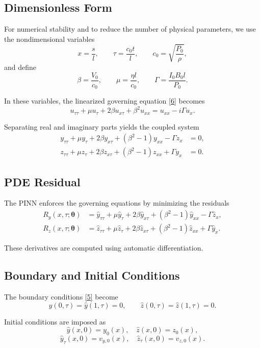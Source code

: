 \documentclass{article}
\begin{document}
\subsection{Dimensionless Form}

For numerical stability and to reduce the number of physical parameters, we use the nondimensional variables
\[
x = \frac{s}{l}, \qquad \tau = \frac{c_0 t}{l}, \qquad c_0 = \sqrt{\frac{P_0}{\rho}},
\]
and define
\[
\beta = \frac{V_0}{c_0}, \qquad
\mu = \frac{\eta l}{c_0}, \qquad
\Gamma = \frac{I_0 B_0 l}{P_0}.
\]

In these variables, the linearized governing equation \eqref{6} becomes
\[
u_{\tau\tau} + \mu u_{\tau} + 2\beta u_{x\tau} + \beta^2 u_{xx}
=
u_{xx} - i \Gamma u_x.
\tag{9}
\]

Separating real and imaginary parts yields the coupled system
\begin{align}
y_{\tau\tau} + \mu y_\tau + 2\beta y_{x\tau} + (\beta^2 - 1) y_{xx} - \Gamma z_x &= 0, \\
z_{\tau\tau} + \mu z_\tau + 2\beta z_{x\tau} + (\beta^2 - 1) z_{xx} + \Gamma y_x &= 0.
\end{align}

\subsection{PDE Residual}

The PINN enforces the governing equations by minimizing the residuals
\begin{align}
R_y(x,\tau;\bm{\theta}) &=
\hat{y}_{\tau\tau} + \mu \hat{y}_\tau + 2\beta \hat{y}_{x\tau}
+ (\beta^2 - 1)\hat{y}_{xx} - \Gamma \hat{z}_x, \\
R_z(x,\tau;\bm{\theta}) &=
\hat{z}_{\tau\tau} + \mu \hat{z}_\tau + 2\beta \hat{z}_{x\tau}
+ (\beta^2 - 1)\hat{z}_{xx} + \Gamma \hat{y}_x.
\end{align}

These derivatives are computed using automatic differentiation.

\subsection{Boundary and Initial Conditions}

The boundary conditions \eqref{5} become
\[
\hat{y}(0,\tau) = \hat{y}(1,\tau) = 0,
\qquad
\hat{z}(0,\tau) = \hat{z}(1,\tau) = 0.
\]

Initial conditions are imposed as
\[
\hat{y}(x,0) = y_0(x), \quad
\hat{z}(x,0) = z_0(x),
\]
\[
\hat{y}_\tau(x,0) = v_{y,0}(x), \quad
\hat{z}_\tau(x,0) = v_{z,0}(x).
\]
\end{document}
